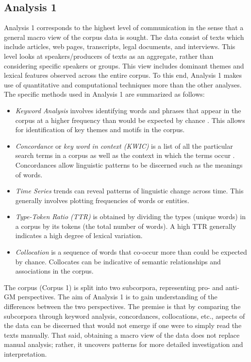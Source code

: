 \subsection{Analysis 1}

Analysis 1 corresponds to the highest level of communication in the sense that a general macro view of the corpus data is sought. The data consist of texts which include articles, web pages, transcripts, legal documents, and interviews. This level looks at speakers/producers of texts as an aggregate, rather than considering specific speakers or groups. This view includes dominant themes and lexical features observed across the entire corpus. To this end, Analysis 1 makes use of quantitative and computational techniques more than the other analyses. The specific methods used in Analysis 1 are summarized as follows:   

   \begin{itemize}
     \item \textit{Keyword Analysis} involves identifying words and phrases that appear in the corpus at a higher frequency than would be expected by chance \citep{Scott2006}. This allows for identification of key themes and motifs in the corpus.
     \item \textit{Concordance} or \textit{key word in context (KWIC)} is a list of all the particular search terms in a corpus as well as the context in which the terms occur \citep[42-43]{Baker2006c}. Concordances allow linguistic patterns to be discerned such as the meanings of words.
     \item \textit{Time Series} trends can reveal patterns of linguistic change across time. This generally involves plotting frequencies of words or entities.
     \item \textit{Type-Token Ratio (TTR)} is obtained by dividing the types (unique words) in a corpus by its tokens (the total number of words). A high TTR generally indicates a high degree of lexical variation.
     \item \textit{Collocation} is a sequence of words that co-occur more than could be expected by chance. Collocates can be indicative of semantic relationships and associations in the corpus.
   \end{itemize}

The corpus (Corpus 1) is split into two subcorpora, representing pro- and anti-GM perspectives. The aim of Analysis 1 is to gain understanding of the differences between the two perspectives. The premise is that by comparing the subcorpora through keyword analysis, concordances, collocations, etc., aspects of the data can be discerned that would not emerge if one were to simply read the texts manually. That said, obtaining a macro view of the data does not replace manual analysis; rather, it uncovers patterns for more detailed investigation and interpretation.     

